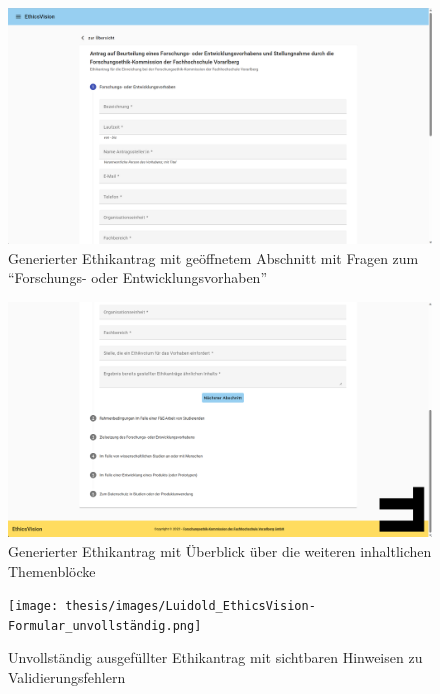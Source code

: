 \documentclass[a4paper,12pt,twoside]{scrreprt}
\begin{document}
\begin{figure}[ht]
    \centering
    \includegraphics[width=\linewidth]{thesis/images/Luidold_EthicsVision-Formular_Start.png}
    \caption{Generierter Ethikantrag mit geöffnetem Abschnitt mit Fragen zum \enquote{Forschungs- oder Entwicklungsvorhaben}}
    \label{fig:ethics-vision-formular-start}
\end{figure}

\begin{figure}[ht]
    \centering
    \includegraphics[width=\linewidth]{thesis/images/Luidold_EthicsVision-Formular_Ende.png}
    \caption{Generierter Ethikantrag mit Überblick über die weiteren inhaltlichen Themenblöcke}
    \label{fig:ethics-vision-formular-ende}
\end{figure}

\begin{figure}[ht]
    \centering
    \texttt{[image: thesis/images/Luidold\_EthicsVision-Formular\_unvollständig.png]}
    \caption{Unvollständig ausgefüllter Ethikantrag mit sichtbaren Hinweisen zu Validierungsfehlern}
    \label{fig:ethics-vision-formular-unvollständig}
\end{figure}
\end{document}

